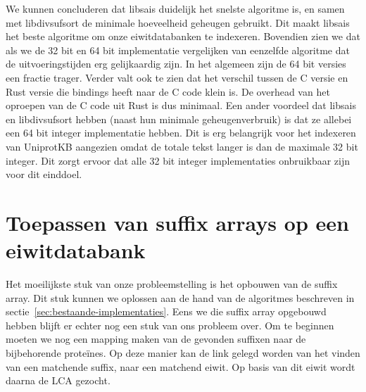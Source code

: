 We kunnen concluderen dat libsais duidelijk het snelste algoritme is, en samen met libdivsufsort de minimale hoeveelheid geheugen gebruikt.
Dit maakt libsais het beste algoritme om onze eiwitdatabanken te indexeren.
Bovendien zien we dat als we de 32 bit en 64 bit implementatie vergelijken van eenzelfde algoritme dat de uitvoeringstijden erg gelijkaardig zijn.
In het algemeen zijn de 64 bit versies een fractie trager.
Verder valt ook te zien dat het verschil tussen de C versie en Rust versie die bindings heeft naar de C code klein is.
De overhead van het oproepen van de C code uit Rust is dus minimaal.
Een ander voordeel dat libsais en libdivsufsort hebben (naast hun minimale geheugenverbruik) is dat ze allebei een 64 bit integer implementatie hebben.
Dit is erg belangrijk voor het indexeren van UniprotKB aangezien omdat de totale tekst langer is dan de maximale 32 bit integer.
Dit zorgt ervoor dat alle 32 bit integer implementaties onbruikbaar zijn voor dit einddoel.

\section{Toepassen van suffix arrays op een eiwitdatabank}\label{sec:toepassen-van-suffix-arrays-op-een-eiwitdatabank}
Het moeilijkste stuk van onze probleemstelling is het opbouwen van de suffix array.
Dit stuk kunnen we oplossen aan de hand van de algoritmes beschreven in sectie~\ref{sec:bestaande-implementaties}.
Eens we die suffix array opgebouwd hebben blijft er echter nog een stuk van ons probleem over.
Om te beginnen moeten we nog een mapping maken van de gevonden suffixen naar de bijbehorende proteïnes.
Op deze manier kan de link gelegd worden van het vinden van een matchende suffix, naar een matchend eiwit.
Op basis van dit eiwit wordt daarna de LCA gezocht.

